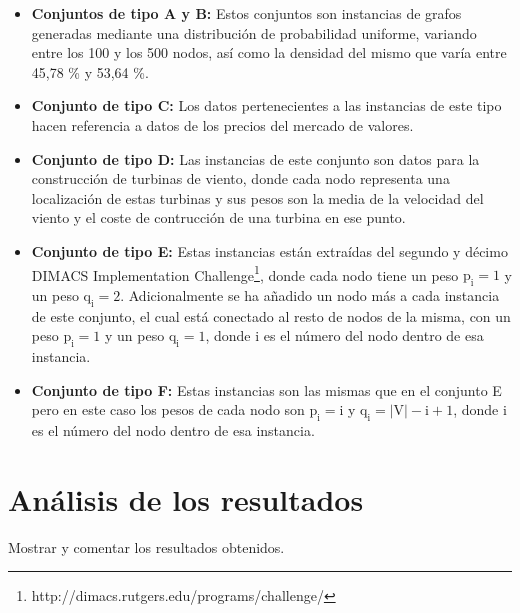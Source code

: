 \begin{itemize}
	
	\item \textbf{Conjuntos de tipo A y B:} Estos conjuntos son instancias de grafos generadas mediante una distribución de probabilidad uniforme, variando entre los 100 y los 500 nodos, así como la densidad del mismo que varía entre 45,78 \% y 53,64 \%.
	\item  \textbf{Conjunto de tipo C:} Los datos pertenecientes a las instancias de este tipo hacen referencia a datos de los precios del mercado de valores.
	\item  \textbf{Conjunto de tipo D:} Las instancias de este conjunto son datos para la construcción de turbinas de viento, donde cada nodo representa una localización de estas turbinas y sus pesos son la media de la velocidad del viento y el coste de contrucción de una turbina en ese punto.
	\item  \textbf{Conjunto de tipo E:} Estas instancias están extraídas del segundo y décimo DIMACS Implementation Challenge\footnote{http://dimacs.rutgers.edu/programs/challenge/}, donde cada nodo tiene un peso $\mathrm{p_{i} = 1}$ y un peso $\mathrm{q_{i} = 2}$. Adicionalmente se ha añadido un nodo más a cada instancia de este conjunto, el cual está conectado al resto de nodos de la misma, con un peso $\mathrm{p_{i} = 1}$ y un peso $\mathrm{q_{i} = 1}$, donde i es el número del nodo dentro de esa instancia.
	\item  \textbf{Conjunto de tipo F:} Estas instancias son las mismas que en el conjunto E pero en este caso los pesos de cada nodo son $\mathrm{p_{i} = i}$ y $\mathrm{q_{i} = |V| - i + 1}$, donde i es el número del nodo dentro de esa instancia.
	
	
\end{itemize}


\section{Análisis de los resultados}
Mostrar y comentar los resultados obtenidos.

